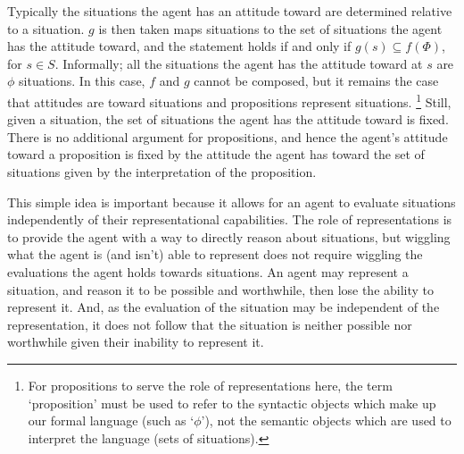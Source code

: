 \documentclass[10pt]{article}
\begin{document}
Typically the situations the agent has an attitude toward are determined relative to a situation.
\(g\) is then taken maps situations to the set of situations the agent has the attitude toward, and the statement holds if and only if \(g(s) \subseteq f(\Phi)\), for \(s \in S\).
Informally; all the situations the agent has the attitude toward at \(s\) are \(\phi\) situations.
In this case, \(f\) and \(g\) cannot be composed, but it remains the case that attitudes are toward situations and propositions represent situations.\nolinebreak
\footnote{
  For propositions to serve the role of representations here, the term `proposition' must be used to refer to the syntactic objects which make up our formal language (such as `\(\phi\)'), not the semantic objects which are used to interpret the language (sets of situations).
}
Still, given a situation, the set of situations the agent has the attitude toward is fixed.
There is no additional argument for propositions, and hence the agent's attitude toward a proposition is fixed by the attitude the agent has toward the set of situations given by the interpretation of the proposition.

This simple idea is important because it allows for an agent to evaluate situations independently of their representational capabilities.
The role of representations is to provide the agent with a way to directly reason about situations, but wiggling what the agent is (and isn't) able to represent does not require wiggling the evaluations the agent holds towards situations.
An agent may represent a situation, and reason it to be possible and worthwhile, then lose the ability to represent it.
And, as the evaluation of the situation may be independent of the representation, it does not follow that the situation is neither possible nor worthwhile given their inability to represent it.
\end{document}
